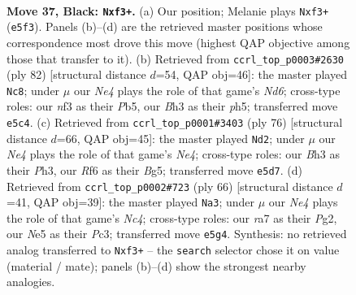 \documentclass[11pt]{article}
\begin{document}
\clearpage

\begin{figure}[p]\centering
\begin{subfigure}{0.46\textwidth}\centering
\resizebox{\linewidth}{!}{%
\newchessgame
\chessboard[
  setfen={7k/R4p1p/5rp1/3Pn3/1p2P3/5NPb/1r5P/4K2R b - - 5 37},
  showmover=false,
  pgfstyle=straightmove, color=movearrow, markmove={e5-f3}
]}
\caption{}
\end{subfigure}\hfill
\begin{subfigure}{0.46\textwidth}\centering
\resizebox{\linewidth}{!}{%
\newchessgame
\chessboard[
  setfen={4n3/4rpk1/3N2p1/1P5p/3R3P/1r4P1/R4PK1/8 w - - 1 42},
  showmover=false,
  pgfstyle=straightmove, color=movearrow, markmove={d6-c8}
]}
\caption{}
\end{subfigure}
\\[4pt]
\begin{subfigure}{0.46\textwidth}\centering
\resizebox{\linewidth}{!}{%
\newchessgame
\chessboard[
  setfen={7r/p2kb1p1/1p3n2/4p1Bp/4N3/P5PP/1PR1KP2/8 w - - 2 39},
  showmover=false,
  pgfstyle=straightmove, color=movearrow, markmove={e4-d2}
]}
\caption{}
\end{subfigure}\hfill
\begin{subfigure}{0.46\textwidth}\centering
\resizebox{\linewidth}{!}{%
\newchessgame
\chessboard[
  setfen={r4k2/8/2r1pp1p/p2n2p1/2N5/2P3P1/1P1R1PP1/4R1K1 w - - 0 34},
  showmover=false,
  pgfstyle=straightmove, color=movearrow, markmove={c4-a3}
]}
\caption{}
\end{subfigure}
\caption{\textbf{Move 37, Black: \texttt{Nxf3+}.} (a) Our position; Melanie plays \texttt{Nxf3+} (\texttt{e5f3}). Panels (b)--(d) are the retrieved master positions whose correspondence most drove this move (highest QAP objective among those that transfer to it). (b) Retrieved from \texttt{ccrl\_top\_p0003\#2630} (ply 82) [structural distance $d$=54, QAP obj=46]: the master played \texttt{Nc8}; under $\mu$ our \emph{Ne4} plays the role of that game's \emph{Nd6}; cross-type roles: our \emph{n}f3 as their \emph{P}b5, our \emph{B}h3 as their \emph{p}h5; transferred move \texttt{e5c4}. (c) Retrieved from \texttt{ccrl\_top\_p0001\#3403} (ply 76) [structural distance $d$=66, QAP obj=45]: the master played \texttt{Nd2}; under $\mu$ our \emph{Ne4} plays the role of that game's \emph{Ne4}; cross-type roles: our \emph{B}h3 as their \emph{P}h3, our \emph{R}f6 as their \emph{B}g5; transferred move \texttt{e5d7}. (d) Retrieved from \texttt{ccrl\_top\_p0002\#723} (ply 66) [structural distance $d$=41, QAP obj=39]: the master played \texttt{Na3}; under $\mu$ our \emph{Ne4} plays the role of that game's \emph{Nc4}; cross-type roles: our \emph{r}a7 as their \emph{P}g2, our \emph{N}e5 as their \emph{P}c3; transferred move \texttt{e5g4}. Synthesis: no retrieved analog transferred to \texttt{Nxf3+} -- the \texttt{search} selector chose it on value (material / mate); panels (b)--(d) show the strongest nearby analogies.}
\label{fig:thought-m73}
\end{figure}
\end{document}
